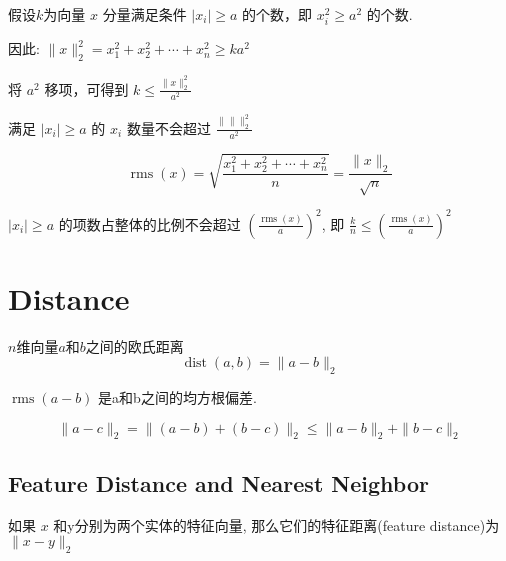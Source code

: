 \begin{theorem}
    假设$k$为向量 $ x $ 分量满足条件 $ \left|x_{i}\right| \geq a $ 的个数，即 $ x_{i}^{2} \geq a^{2} $ 的个数. 

    因此: $ \|x\|_{2}^{2}=x_{1}^{2}+x_{2}^{2}+\cdots+x_{n}^{2} \geq k a^{2} $

    将 $ a^{2} $ 移项，可得到 $ k \leq \frac{\|x\|_{2}^{2}}{a^{2}} $

    满足 $ \left|x_{i}\right| \geq a $ 的 $ x_{i} $ 数量不会超过 $ \frac{\|\| \|_{2}^{2}}{a^{2}} $
\end{theorem}

\begin{corollary}
    $$ \operatorname{rms}(x)=\sqrt{\frac{x_{1}^{2}+x_{2}^{2}+\cdots+x_{n}^{2}}{n}}=\frac{\|x\|_{2}}{\sqrt{n}} $$

    $ \left|x_{i}\right| \geq a $ 的项数占整体的比例不会超过 $ \left(\frac{\operatorname{rms}(x)}{a}\right)^{2} $, 即 $ \frac{k}{n} \leq\left(\frac{\operatorname{rms}(x)}{a}\right)^{2} $
\end{corollary}

\section{Distance}

\begin{definition}
    $n$维向量$a$和$b$之间的欧氏距离
    $$ \operatorname{dist}(a, b)=\|a-b\|_{2} $$
\end{definition}

\begin{definition}
    $ \operatorname{rms}(a-b) $ 是a和b之间的均方根偏差.
\end{definition}

\begin{theorem}
    $$ \|a-c\|_{2}=\|(a-b)+(b-c)\|_{2} \leq\|a-b\|_{2}+\|b-c\|_{2} $$
\end{theorem}

\subsection{Feature Distance and Nearest Neighbor}

\begin{definition}
    如果 $ x $ 和y分别为两个实体的特征向量, 那么它们的特征距离(feature distance)为 $ \|x-y\|_{2} $
\end{definition}

